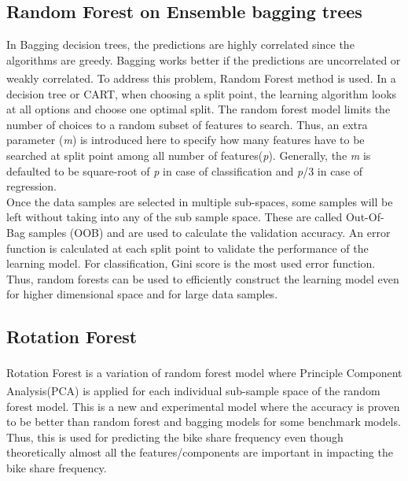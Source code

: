 \documentclass[journal, a4paper]{IEEEtran}
\begin{document}
\subsection{Random Forest on Ensemble bagging trees}
In Bagging decision trees, the predictions are highly correlated since the algorithms are greedy. Bagging works better if the predictions are uncorrelated or weakly correlated. To address this problem, Random Forest method\textsuperscript{\cite{randomForest}} is used. In a decision tree or CART, when choosing a split point, the learning algorithm looks at all options and choose one optimal split. The random forest model limits the number of choices to a random subset of features to search. Thus, an extra parameter (\textit{m}) is introduced here to specify how many features have to be searched at split point among all number of features(\textit{p}). Generally, the \textit{m} is defaulted to be square-root of \textit{p} in case of classification and \textit{p}/3 in case of regression. \\
\indent Once the data samples are selected in multiple sub-spaces, some samples will be left without taking into any of the sub sample space. These are called Out-Of-Bag samples (OOB) and are used to calculate the validation accuracy. An error function is calculated at each split point to validate the performance of the learning model. For classification, Gini score is the most used error function. Thus, random forests can be used to efficiently construct the learning model even for higher dimensional space and for large data samples. 

\subsection{Rotation Forest}
Rotation Forest\textsuperscript{\cite{rotationForest}} is a variation of random forest model where Principle Component Analysis(PCA)\textsuperscript{\cite{pca}} is applied for each individual sub-sample space of the random forest model. This is a new and experimental model where the accuracy is proven to be better than random forest and bagging models for some benchmark models. Thus, this is used for predicting the bike share frequency even though theoretically almost all the features/components are important in impacting the bike share frequency.
\end{document}
